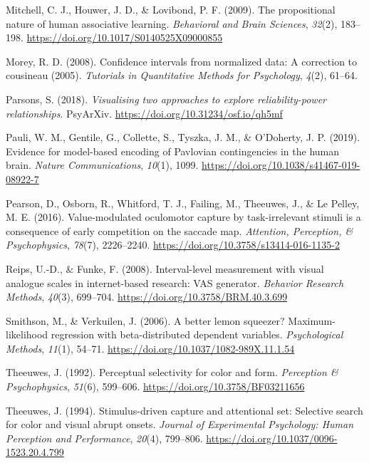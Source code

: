 \documentclass[
  jou,
  floatsintext,
  longtable,
  nolmodern,
  notxfonts,
  notimes,
  colorlinks=true,linkcolor=blue,citecolor=blue,urlcolor=blue]{apa7}
\newlength{\cslhangindent}
\newenvironment{CSLReferences}[2] %
 {\begin{list}{}{%
  \setlength{\itemindent}{0pt}
  \setlength{\leftmargin}{0pt}
  \setlength{\parsep}{0pt}
  \ifodd #1
   \setlength{\leftmargin}{\cslhangindent}
   \setlength{\itemindent}{-1\cslhangindent}
  \fi
  \setlength{\itemsep}{#2\baselineskip}}}
 {\end{list}}
\begin{document}
\begin{CSLReferences}{1}{0}
Mitchell, C. J., Houwer, J. D., \& Lovibond, P. F. (2009). The
propositional nature of human associative learning. \emph{Behavioral and
Brain Sciences}, \emph{32}(2), 183--198.
\url{https://doi.org/10.1017/S0140525X09000855}

Morey, R. D. (2008). Confidence intervals from normalized data: A
correction to cousineau (2005). \emph{Tutorials in Quantitative Methods
for Psychology}, \emph{4}(2), 61--64.

Parsons, S. (2018). \emph{Visualising two approaches to explore
reliability-power relationships}. PsyArXiv.
\url{https://doi.org/10.31234/osf.io/qh5mf}

Pauli, W. M., Gentile, G., Collette, S., Tyszka, J. M., \& O'Doherty, J.
P. (2019). Evidence for model-based encoding of Pavlovian contingencies
in the human brain. \emph{Nature Communications}, \emph{10}(1), 1099.
\url{https://doi.org/10.1038/s41467-019-08922-7}

Pearson, D., Osborn, R., Whitford, T. J., Failing, M., Theeuwes, J., \&
Le Pelley, M. E. (2016). Value-modulated oculomotor capture by
task-irrelevant stimuli is a consequence of early competition on the
saccade map. \emph{Attention, Perception, \& Psychophysics},
\emph{78}(7), 2226--2240.
\url{https://doi.org/10.3758/s13414-016-1135-2}

Reips, U.-D., \& Funke, F. (2008). Interval-level measurement with
visual analogue scales in internet-based research: VAS generator.
\emph{Behavior Research Methods}, \emph{40}(3), 699--704.
\url{https://doi.org/10.3758/BRM.40.3.699}

Smithson, M., \& Verkuilen, J. (2006). A better lemon squeezer?
Maximum-likelihood regression with beta-distributed dependent variables.
\emph{Psychological Methods}, \emph{11}(1), 54--71.
\url{https://doi.org/10.1037/1082-989X.11.1.54}

Theeuwes, J. (1992). Perceptual selectivity for color and form.
\emph{Perception \& Psychophysics}, \emph{51}(6), 599--606.
\url{https://doi.org/10.3758/BF03211656}

Theeuwes, J. (1994). Stimulus-driven capture and attentional set:
Selective search for color and visual abrupt onsets. \emph{Journal of
Experimental Psychology: Human Perception and Performance},
\emph{20}(4), 799--806. \url{https://doi.org/10.1037/0096-1523.20.4.799}


\end{CSLReferences}
\end{document}
